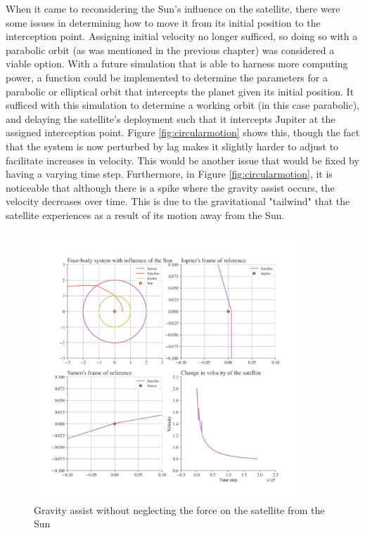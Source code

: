 \documentclass[12pt, english]{report}
\begin{document}
{When it came to reconsidering the Sun's influence on the satellite, there were some issues in determining how to move it from its initial position to the interception point. Assigning initial velocity no longer sufficed, so doing so with a parabolic orbit (as was mentioned in the previous chapter) was considered a viable option. With a future simulation that is able to harness more computing power, a function could be implemented to determine the parameters for a parabolic or elliptical orbit that intercepts the planet given its initial position. It sufficed with this simulation to determine a working orbit (in this case parabolic), and delaying the satellite's deployment such that it intercepts Jupiter at the assigned interception point. Figure \ref{fig:circularmotion} shows this, though the fact that the system is now perturbed by lag makes it slightly harder to adjust to facilitate increases in velocity. This would be another issue that would be fixed by having a varying time step. Furthermore, in Figure \ref{fig:circularmotion}, it is noticeable that although there is a spike where the gravity assist occurs, the velocity decreases over time. This is due to the gravitational "tailwind" that the satellite experiences as a result of its motion away from the Sun.

\begin{figure}[ht]
    \centering
    \includegraphics[width=0.9\textwidth]{graphics/fourbody.png}
    \caption{Gravity assist without neglecting the force on the satellite from the Sun}
    \label{fig:fourbody}
\end{figure}

}
\end{document}
